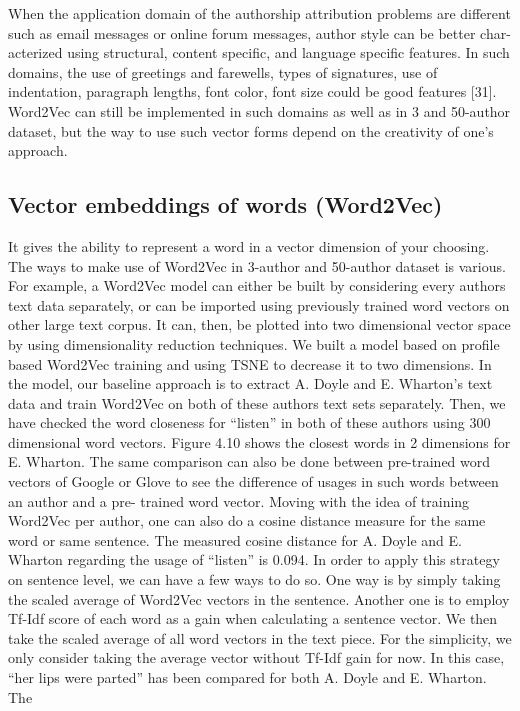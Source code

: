 When the application domain of the authorship attribution problems are different
such as email messages or online forum messages, author style can be better char-
acterized using structural, content specific, and language specific features. In such
domains, the use of greetings and farewells, types of signatures, use of indentation,
paragraph lengths, font color, font size could be good features [31]. Word2Vec can
still be implemented in such domains as well as in 3 and 50-author dataset, but the
way to use such vector forms depend on the creativity of one’s approach.

\subsection{Vector embeddings of words (Word2Vec)}
It gives the ability to represent a word in a vector dimension of your choosing.
The ways to make use of Word2Vec in 3-author and 50-author dataset is various.
For example, a Word2Vec model can either be built by considering every authors
text data separately, or can be imported using previously trained word vectors on
other large text corpus. It can, then, be plotted into two dimensional vector space
by using dimensionality reduction techniques. We built a model based on profile
based Word2Vec training and using TSNE to decrease it to two dimensions. In the model, our baseline approach is to extract A. Doyle and E. Wharton’s text data and
train Word2Vec on both of these authors text sets separately. Then, we have checked
the word closeness for “listen” in both of these authors using 300 dimensional word
vectors. Figure 4.10 shows the closest words in 2 dimensions for E. Wharton. The
same comparison can also be done between pre-trained word vectors of Google or
Glove to see the difference of usages in such words between an author and a pre-
trained word vector.
Moving with the idea of training Word2Vec per author, one can also do a cosine
distance measure for the same word or same sentence. The measured cosine distance
for A. Doyle and E. Wharton regarding the usage of “listen” is 0.094. In order to
apply this strategy on sentence level, we can have a few ways to do so. One way is by
simply taking the scaled average of Word2Vec vectors in the sentence. Another one is
to employ Tf-Idf score of each word as a gain when calculating a sentence vector.
We then take the scaled average of all word vectors in the text piece. For the simplicity,
we only consider taking the average vector without Tf-Idf gain for now. In this case,
“her lips were parted” has been compared for both A. Doyle and E. Wharton. The
